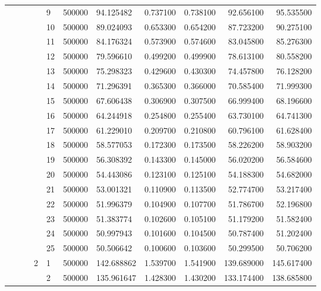\begin{tabular}{lllllllrrrr}
\cline{5-11}
 &  &  &  & 9 & 500000 & 94.125482 & 0.737100 & 0.738100 & 92.656100 & 95.535500 \\
\cline{5-11}
 &  &  &  & 10 & 500000 & 89.024093 & 0.653300 & 0.654200 & 87.723200 & 90.275100 \\
\cline{5-11}
 &  &  &  & 11 & 500000 & 84.176324 & 0.573900 & 0.574600 & 83.045800 & 85.276300 \\
\cline{5-11}
 &  &  &  & 12 & 500000 & 79.596610 & 0.499200 & 0.499900 & 78.613100 & 80.558200 \\
\cline{5-11}
 &  &  &  & 13 & 500000 & 75.298323 & 0.429600 & 0.430300 & 74.457800 & 76.128200 \\
\cline{5-11}
 &  &  &  & 14 & 500000 & 71.296391 & 0.365300 & 0.366000 & 70.585400 & 71.999300 \\
\cline{5-11}
 &  &  &  & 15 & 500000 & 67.606438 & 0.306900 & 0.307500 & 66.999400 & 68.196600 \\
\cline{5-11}
 &  &  &  & 16 & 500000 & 64.244918 & 0.254800 & 0.255400 & 63.730100 & 64.741300 \\
\cline{5-11}
 &  &  &  & 17 & 500000 & 61.229010 & 0.209700 & 0.210800 & 60.796100 & 61.628400 \\
\cline{5-11}
 &  &  &  & 18 & 500000 & 58.577053 & 0.172300 & 0.173500 & 58.226200 & 58.903200 \\
\cline{5-11}
 &  &  &  & 19 & 500000 & 56.308392 & 0.143300 & 0.145000 & 56.020200 & 56.584600 \\
\cline{5-11}
 &  &  &  & 20 & 500000 & 54.443086 & 0.123100 & 0.125100 & 54.188300 & 54.682000 \\
\cline{5-11}
 &  &  &  & 21 & 500000 & 53.001321 & 0.110900 & 0.113500 & 52.774700 & 53.217400 \\
\cline{5-11}
 &  &  &  & 22 & 500000 & 51.996379 & 0.104900 & 0.107700 & 51.786700 & 52.196800 \\
\cline{5-11}
 &  &  &  & 23 & 500000 & 51.383774 & 0.102600 & 0.105100 & 51.179200 & 51.582400 \\
\cline{5-11}
 &  &  &  & 24 & 500000 & 50.997943 & 0.101600 & 0.104500 & 50.787400 & 51.202400 \\
\cline{5-11}
 &  &  &  & 25 & 500000 & 50.506642 & 0.100600 & 0.103600 & 50.299500 & 50.706200 \\
\cline{4-11} \cline{5-11}
 &  &  & \multirow[t]{25}{*}{2} & 1 & 500000 & 142.688862 & 1.539700 & 1.541900 & 139.689000 & 145.617400 \\
\cline{5-11}
 &  &  &  & 2 & 500000 & 135.961647 & 1.428300 & 1.430200 & 133.174400 & 138.685800 \\

\end{tabular}
